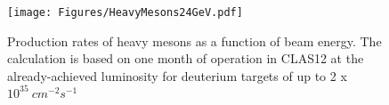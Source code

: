 \begin{figure}
    \centering
    \texttt{[image: Figures/HeavyMesons24GeV.pdf]}
    \caption{Production rates of heavy mesons as a function of beam energy. The calculation is based on one month of operation in CLAS12 at the already-achieved luminosity for deuterium targets of up to 2 x $\mathrm 10^{35}~cm^{-2}s^{-1}$}
    \label{fig:heavymesons}
\end{figure}

\newpage
